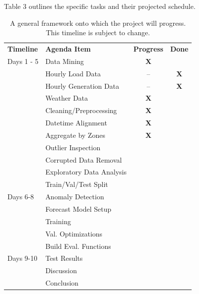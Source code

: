 \documentclass[sigconf]{acmart}
\begin{document}
Table 3 outlines the specific tasks and their projected schedule.

\begin{table}[hbt!]
\centering
\caption{A general framework onto which the project will progress. This timeline is subject to change.}
\begin{tabular}{ll | c | c}
\toprule
\textbf{Timeline} & \textbf{Agenda Item} & \hfil \textbf{Progress} & \hfil \textbf{Done} \\
\cmidrule(rl){1-1}\cmidrule(rl){2-2}\cmidrule(rl){3-3}\cmidrule(rl){4-4}
  Days 1 - 5 & Data Mining & \textbf{X} & \\
  \cmidrule(rl){1-4}
   & \hspace{3mm}Hourly Load Data & -- & \textbf{X} \\   
   & \hspace{3mm}Hourly Generation Data & -- & \textbf{X} \\   
   & \hspace{3mm}Weather Data & \textbf{X} & \\   
   & Cleaning/Preprocessing & \textbf{X} & \\  
   \cmidrule(rl){2-4} 
   & \hspace{3mm}Datetime Alignment & \textbf{X} & \\   
   & \hspace{3mm}Aggregate by Zones & \textbf{X} & \\   
   & \hspace{3mm}Outlier Inspection & & \\   
   & \hspace{3mm}Corrupted Data Removal & & \\  
   & Exploratory Data Analysis & & \\  
   \cmidrule(rl){2-4} 
   & Train/Val/Test Split & & \\  
   \cmidrule(rl){2-4} 
  Days 6-8 & Anomaly Detection & & \\  
   \cmidrule(rl){1-4} 
   & Forecast Model Setup & & \\  
   \cmidrule(rl){2-4} 
   & \hspace{3mm}Training & & \\  
   & \hspace{3mm}Val. Optimizations & & \\  
   & Build Eval. Functions & & \\  
   \cmidrule(rl){2-4} 
  Days 9-10 & Test Results & & \\  
  \cmidrule(rl){1-4} 
   & Discussion & & \\
   \cmidrule(rl){2-4}   
   & Conclusion & & \\  
   \cmidrule(rl){2-4} 
  \bottomrule
\end{tabular}
\end{table}
\end{document}
